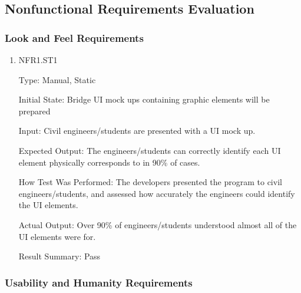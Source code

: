 \documentclass[12pt, titlepage]{article}
\begin{document}
\subsection{Nonfunctional Requirements Evaluation}

\subsubsection{Look and Feel Requirements}

\begin{enumerate}

\item{NFR1.ST1\\}

Type: Manual, Static

Initial State: Bridge UI mock ups containing graphic elements will be prepared

Input: Civil engineers/students are presented with a UI mock up.

Expected Output: The engineers/students can correctly identify each UI element physically corresponds to in 90\% of cases.

How Test Was Performed: The developers presented the program to civil engineers/students, and assessed how accurately the engineers could identify the UI elements.

Actual Output: Over 90\% of engineers/students understood almost all of the UI elements were for.

Result Summary: Pass

\end{enumerate}

\subsubsection{Usability and Humanity Requirements}
		
\end{document}
